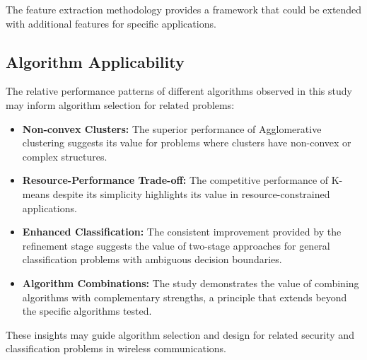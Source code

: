 The feature extraction methodology provides a framework that could be extended with additional features for specific applications.

\subsection{Algorithm Applicability}

The relative performance patterns of different algorithms observed in this study may inform algorithm selection for related problems:

\begin{itemize}
    \item \textbf{Non-convex Clusters:} The superior performance of Agglomerative clustering suggests its value for problems where clusters have non-convex or complex structures.
    
    \item \textbf{Resource-Performance Trade-off:} The competitive performance of K-means despite its simplicity highlights its value in resource-constrained applications.
    
    \item \textbf{Enhanced Classification:} The consistent improvement provided by the refinement stage suggests the value of two-stage approaches for general classification problems with ambiguous decision boundaries.
    
    \item \textbf{Algorithm Combinations:} The study demonstrates the value of combining algorithms with complementary strengths, a principle that extends beyond the specific algorithms tested.
\end{itemize}

These insights may guide algorithm selection and design for related security and classification problems in wireless communications.
